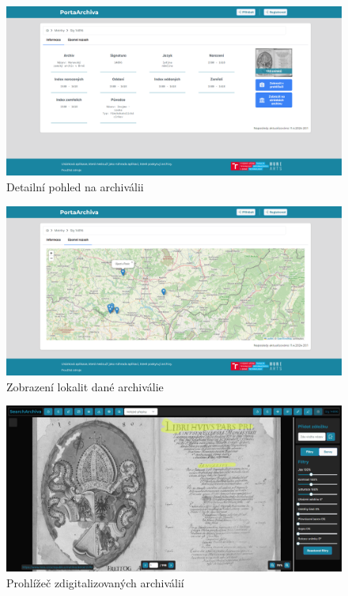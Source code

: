 \begin{figure}[htbp]
\centering
    \includegraphics[scale=.22]{obrazky-figures/implementation/productScreenshots/detail.png}
    \caption{Detailní pohled na archiválii}
\end{figure}

\begin{figure}[htbp]
\centering
    \includegraphics[scale=.22]{obrazky-figures/implementation/productScreenshots/detail_locations.png}
    \caption{Zobrazení lokalit dané archiválie}
\end{figure}

\begin{figure}[htbp]
\centering
    \includegraphics[scale=.22]{obrazky-figures/implementation/productScreenshots/scanPreview.png}
    \caption{Prohlížeč zdigitalizovaných archiválií}
\end{figure}

